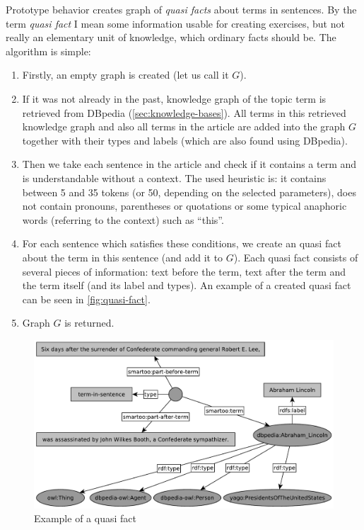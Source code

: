 \documentclass[12pt, twoside]{fithesis2}		%
\renewcommand{\_}{\leavevmode \kern0.07em\vbox{\hrule width0.4em}}
\newenvironment{myEnumerate}{
  \begin{enumerate}[leftmargin=2em,rightmargin=1em,itemsep=\parskip ,parsep=0em,topsep=0em,partopsep=0em]
}{
  \end{enumerate}
}
\begin{document}
Prototype behavior creates graph of \textit{quasi facts} about terms in sentences.
By the term \textit{quasi fact} I mean some information usable for creating exercises, but not really an elementary unit of knowledge, which ordinary facts should be. The algorithm is simple:
\begin{myEnumerate}
  \item Firstly, an empty graph is created (let us call it $G$).
  \item If it was not already in the past, knowledge graph of the topic term is retrieved from DBpedia (\autoref{sec:knowledge-bases}). All terms in this retrieved knowledge graph and also all terms in the article are added into the graph $G$ together with their types and labels (which are also found using DBpedia).
  \item Then we take each sentence in the article and check if it contains a term and is understandable without a context. The used heuristic is: it contains between 5 and 35 tokens (or 50, depending on the selected parameters), does not contain pronouns, parentheses or quotations or some typical anaphoric words (referring to the context) such as ``this''.
  \item For each sentence which satisfies these conditions, we create an quasi fact about the term in this sentence (and add it to $G$). Each quasi fact consists of several pieces of information: text before the term, text after the term and the term itself (and its label and types). An example of a created quasi fact can be seen in \autoref{fig:quasi-fact}.
  \item Graph $G$ is returned.
\end{myEnumerate}


\begin{figure}[h]
  \centering
  \includegraphics[width=\textwidth]{images/quasi-fact-lincoln.pdf}
  \caption{Example of a quasi fact}
  \label{fig:quasi-fact}
\end{figure}
\end{document}
